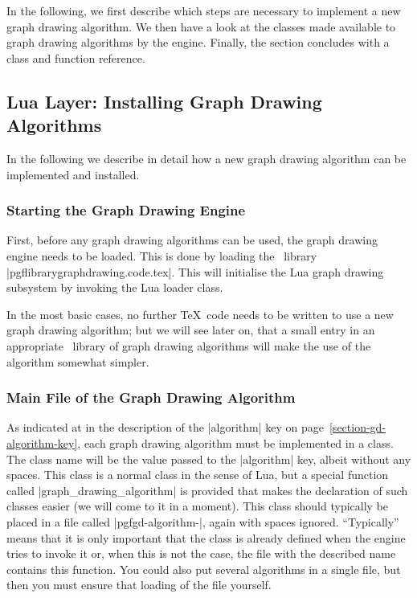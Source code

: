 In the following, we first describe which steps are necessary to
implement a new graph drawing algorithm. We then have a look at the
classes made available to graph drawing algorithms by the
engine. Finally, the section concludes with a class and function
reference.



\subsection{Lua Layer: Installing Graph Drawing Algorithms}
\label{section-gd-implementing-algorithms}

In the following we describe in detail how a new graph drawing
algorithm can be implemented and installed. 


\subsubsection{Starting the Graph Drawing Engine}

First, before any graph drawing algorithms can be used, the graph
drawing engine needs to be loaded. This is done by loading the
\pgfname\ library |pgflibrarygraphdrawing.code.tex|. This will
initialise the Lua graph drawing subsystem by invoking the Lua loader
class.   

In the most basic cases, no further \TeX\ code needs to be written to
use a new graph drawing algorithm; but we will see later on, that a
small entry in an appropriate \pgfname\ library of graph drawing
algorithms will make the use of the algorithm somewhat simpler.\


\subsubsection{Main File of the Graph Drawing Algorithm}

As indicated at in the description of the |algorithm| key on
page~\ref{section-gd-algorithm-key}, each graph drawing algorithm  
must be implemented in a class. The class name will be the value
passed to the |algorithm| key, albeit without any spaces. This class
is a normal class in the sense of Lua, but a special function called
|graph_drawing_algorithm| is provided that makes the declaration of
such classes easier (we will come to it in a moment). This class
should typically be placed in a file called
|pgfgd-algorithm-|, again with spaces
ignored. ``Typically'' means that it is only 
important that the class is already defined when the engine
tries to invoke it or, when this is not the case, the file with the
described name contains this function. You could also put several
algorithms in a single file, but then you must ensure that loading of
the file yourself.


